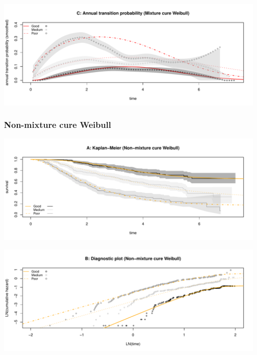 \documentclass[
]{article}
\begin{document}
\begin{flushleft}\includegraphics[height=0.25\textheight]{BC_OS_output/Images/Figure_cure_models-3} \end{flushleft}

\clearpage

\subsubsection{Non-mixture cure Weibull}\label{non-mixture-cure-weibull}

\begin{flushleft}\includegraphics[height=0.25\textheight]{BC_OS_output/Images/Figure_cure_models-4} \end{flushleft}

\begin{flushleft}\includegraphics[height=0.25\textheight]{BC_OS_output/Images/Figure_cure_models-5} \end{flushleft}
\end{document}

